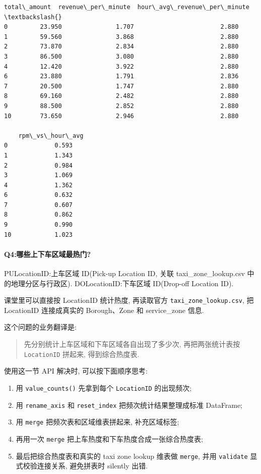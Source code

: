 \documentclass[11pt]{article}
\providecommand{\tightlist}{%
      \setlength{\itemsep}{0pt}\setlength{\parskip}{0pt}}
\begin{document}
\begin{Verbatim}[commandchars=\\\{\}]
    total\_amount  revenue\_per\_minute  hour\_avg\_revenue\_per\_minute  \textbackslash{}
0         23.950               1.707                        2.880
1         59.560               3.868                        2.880
2         73.870               2.834                        2.880
3         86.500               3.080                        2.880
4         12.420               3.922                        2.880
6         23.880               1.791                        2.836
7         20.500               1.747                        2.880
8         69.160               2.482                        2.880
9         88.500               2.852                        2.880
10        73.650               2.946                        2.880

    rpm\_vs\_hour\_avg
0             0.593
1             1.343
2             0.984
3             1.069
4             1.362
6             0.632
7             0.607
8             0.862
9             0.990
10            1.023
    \end{Verbatim}

    \paragraph{Q4:哪些上下车区域最热门?}\label{q4ux54eaux4e9bux4e0aux4e0bux8f66ux533aux57dfux6700ux70edux95e8}

    PULocationID:上车区域 ID(Pick-up Location ID, 关联
taxi\_zone\_lookup.csv 中的地理分区与行政区). DOLocationID:下车区域
ID(Drop-off Location ID).

课堂里可以直接按 LocationID 统计热度, 再读取官方
\texttt{taxi\_zone\_lookup.csv}, 把 LocationID 连接成真实的
Borough、Zone 和 service\_zone 信息.

这个问题的业务翻译是:

\begin{quote}
先分别统计上车区域和下车区域各自出现了多少次, 再把两张统计表按
\texttt{LocationID} 拼起来, 得到综合热度表.
\end{quote}

使用这一节 API 解决时, 可以按下面顺序思考:

\begin{enumerate}
\def\labelenumi{\arabic{enumi}.}
\tightlist
\item
  用 \texttt{value\_counts()} 先拿到每个 \texttt{LocationID} 的出现频次;
\item
  用 \texttt{rename\_axis} 和 \texttt{reset\_index}
  把频次统计结果整理成标准 DataFrame;
\item
  用 \texttt{merge} 把频次表和区域维表拼起来, 补充区域标签;
\item
  再用一次 \texttt{merge} 把上车热度和下车热度合成一张综合热度表;
\item
  最后把综合热度表和真实的 taxi zone lookup 维表做 \texttt{merge}, 并用
  \texttt{validate} 显式校验连接关系, 避免拼表时 silently 出错.
\end{enumerate}
\end{document}
